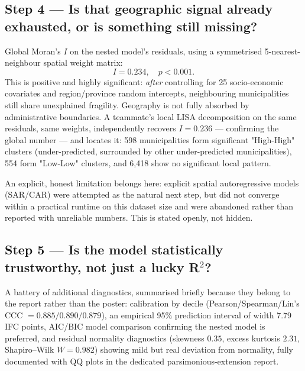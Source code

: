 \documentclass[11pt,a4paper]{article}
\begin{document}
\subsection*{Step 4 --- Is that geographic signal already exhausted,
or is something still missing?}
Global Moran's $I$ on the nested model's residuals, using a
symmetrised 5-nearest-neighbour spatial weight matrix:
$$ I = 0.234, \quad p < 0.001. $$
This is positive and highly significant: \emph{after} controlling
for 25 socio-economic covariates and region/province random
intercepts, neighbouring municipalities still share unexplained
fragility. Geography is not fully absorbed by administrative
boundaries. A teammate's local LISA decomposition on the same
residuals, same weights, independently recovers $I = 0.236$ ---
confirming the global number --- and locates it: 598 municipalities
form significant "High-High" clusters (under-predicted, surrounded
by other under-predicted municipalities), 554 form "Low-Low"
clusters, and 6{,}418 show no significant local pattern.

An explicit, honest limitation belongs here: explicit spatial
autoregressive models (SAR/CAR) were attempted as the natural next
step, but did not converge within a practical runtime on this
dataset size and were abandoned rather than reported with
unreliable numbers. This is stated openly, not hidden.

\subsection*{Step 5 --- Is the model statistically trustworthy, not
just a lucky R$^2$?}
A battery of additional diagnostics, summarised briefly because they
belong to the report rather than the poster: calibration by decile
(Pearson/Spearman/Lin's CCC $= 0.885/0.890/0.879$), an empirical 95\%
prediction interval of width 7.79 IFC points, AIC/BIC model
comparison confirming the nested model is preferred, and residual
normality diagnostics (skewness $0.35$, excess kurtosis $2.31$,
Shapiro--Wilk $W = 0.982$) showing mild but real deviation from
normality, fully documented with QQ plots in the dedicated
parsimonious-extension report.
\end{document}
